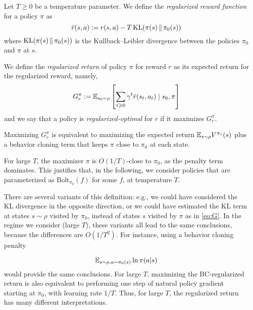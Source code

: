 \documentclass[11pt,a4paper]{article}
\newcommand{\Bol}{\mathrm{Bolt}_{\pi_0}}
\newcommand{\TODO}[1]{{\color{red} TODO: {#1}}}
\newcommand{\option}[1]{{\color[rgb]{.4,0,.8}[Optional:#1]}} %
\renewcommand{\TODO}[1]{}
\renewcommand{\option}[1]{}  %
\begin{document}
\begin{defi}
\label{def:regul}
Let $T\geq 0$ be 
a temperature parameter. We define the \emph{regularized reward function}
for a policy $\pi$ as
\begin{equation}
\label{eq:regulr}
\bar r(s,a)\mathrel{\mathop{:}}= r(s,a) - T\, \mathrm{KL}\!\left(\pi(s) \,|\hspace{-.15ex}|\,\pi_0(s)\right)
\end{equation}
where $\mathrm{KL}\!\left(\pi(s) \,|\hspace{-.15ex}|\,\pi_0(s)\right)$ is the Kullback--Leibler divergence between
the policies $\pi_0$ and $\pi$ at $s$.

We define the \emph{regularized return} of policy $\pi$ for reward $r$ as
its expected return for the regularized reward, namely,
\begin{equation}
\label{eq:G}
G^\pi_r\mathrel{\mathop{:}}= \mathbb{E}_{s_0\sim \rho} \left[\sum_{t\geqslant 0} \gamma^t \bar r(s_t,a_t)
\mid s_0,\pi
\right]
\end{equation}
and we say that a policy is \emph{regularized-optimal} for $r$ if it maximizes
$G^{\pi}_r$.
\end{defi}

Maximizing $G^\pi_r$ is equivalent to maximizing the expected
return $\mathbb{E}_{s\sim \rho} V^{\pi_r}(s)$ plus a behavior cloning term
that keeps $\pi$ close to $\pi_0$ at each state.

For large $T$, the maximizer $\pi$ is $O(1/T)$-close to
$\pi_0$, as the penalty term dominates. This justifies that, in the
following, we consider policies 
that are parameterized as $\Bol(f)$ for some $f$, at temperature $T$.

There are several variants of this definition: e.g., we could have
considered the KL divergence in the opposite direction, or we could have
estimated the KL term at states $s\sim \rho$ visited by $\pi_0$, instead of states $s$
visited by $\pi$ as in \eqref{eq:G}. In the regime we consider (large $T$), these variants
all lead to the same conclusions, because the differences are $O(1/T^2)$.
\option{ add proposition: same 1st order
Taylor expansion} For instance, using a behavior cloning penalty
\TODO{REF}
\begin{equation}
\mathbb{E}_{s\sim \rho,a\sim \pi_0(s)} \ln \pi(a|s)
\end{equation}
would provide the same conclusions.
For large $T$, maximizing the BC-regularized return
is also equivalent to performing one step of natural policy gradient starting
at $\pi_0$, with learning rate $1/T$\option{ (Section~\ref{sec:proofs},
Proposition~\ref{prop:BCisnatgrad})}. Thus, for large $T$, the
regularized return has many different interpretations.
\end{document}

